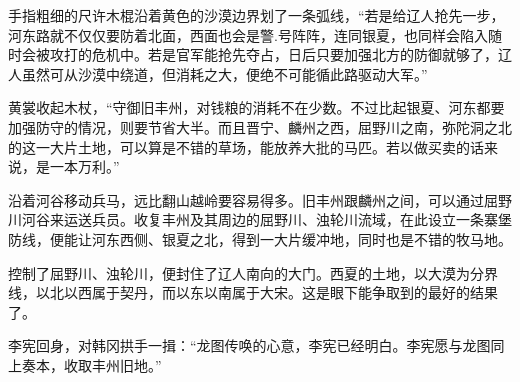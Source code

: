 手指粗细的尺许木棍沿着黄色的沙漠边界划了一条弧线，“若是给辽人抢先一步，河东路就不仅仅要防着北面，西面也会是警.号阵阵，连同银夏，也同样会陷入随时会被攻打的危机中。若是官军能抢先夺占，日后只要加强北方的防御就够了，辽人虽然可从沙漠中绕道，但消耗之大，便绝不可能循此路驱动大军。”

黄裳收起木杖，“守御旧丰州，对钱粮的消耗不在少数。不过比起银夏、河东都要加强防守的情况，则要节省大半。而且晋宁、麟州之西，屈野川之南，弥陀洞之北的这一大片土地，可以算是不错的草场，能放养大批的马匹。若以做买卖的话来说，是一本万利。”

沿着河谷移动兵马，远比翻山越岭要容易得多。旧丰州跟麟州之间，可以通过屈野川河谷来运送兵员。收复丰州及其周边的屈野川、浊轮川流域，在此设立一条寨堡防线，便能让河东西侧、银夏之北，得到一大片缓冲地，同时也是不错的牧马地。

控制了屈野川、浊轮川，便封住了辽人南向的大门。西夏的土地，以大漠为分界线，以北以西属于契丹，而以东以南属于大宋。这是眼下能争取到的最好的结果了。

李宪回身，对韩冈拱手一揖：“龙图传唤的心意，李宪已经明白。李宪愿与龙图同上奏本，收取丰州旧地。”

